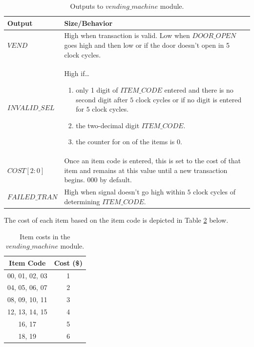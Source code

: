 \documentclass{article}
\begin{document}
\begin{table}[H]
    \centering
    \begin{tabular}{ | m{4cm} | m{8cm} | }
        \hline
        \textbf{Output} & \textbf{Size/Behavior} \\
        \hline
        $VEND$ & High when transaction is valid. Low when $DOOR\_OPEN$ goes high and then low or if the door doesn't open in 5 clock cycles. \\
        \hline
        $INVALID\_SEL$ & High if\dots \begin{enumerate}[noitemsep,topsep=0pt,]
            \item only 1 digit of $ITEM\_CODE$ entered and there is no second digit after $5$ clock cycles or if no digit is entered for $5$ clock cycles.
            \item the two-decimal digit $ITEM\_CODE$.
            \item the counter for on of the items is $0$.
        \end{enumerate} \\
        \hline
        $COST[2:0]$ & Once an item code is entered, this is set to the cost of that item and remains at this value until a new transaction begins. $000$ by default.  \\
        \hline
        $FAILED\_TRAN$ & High when signal doesn't go high within $5$ clock cycles of determining $ITEM\_CODE$. \\
        \hline
    \end{tabular}
    \caption{Outputs to $vending\_machine$ module.}
    \label{table:outputs}
\end{table}

The cost of each item based on the item code is depicted in Table \ref{table:costs} below.

\begin{table}[H]
    \centering
    \begin{tabular}{|c|c|}
        \hline
        \textbf{Item Code} & \textbf{Cost (\$)} \\
        \hline 
        00, 01, 02, 03 & 1 \\
        04, 05, 06, 07 & 2 \\
        08, 09, 10, 11 & 3 \\
        12, 13, 14, 15 & 4 \\
        16, 17 & 5 \\
        18, 19 & 6 \\
        \hline
    \end{tabular}
    \caption{Item costs in the $vending\_machine$ module.}
    \label{table:costs}
\end{table}
\end{document}
